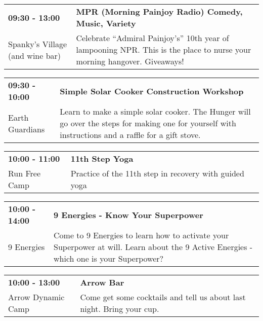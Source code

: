 \begin{tabular}{ p{1in} p{2.2in} }
    \textbf{09:30 - 13:00} & \textbf{MPR (Morning Painjoy Radio) Comedy, Music, Variety} \\
    Spanky's Village (and wine bar) \newline  & Celebrate ``Admiral Painjoy's'' 10th year of lampooning NPR.  This is the place to nurse your morning hangover.  Giveaways! \\
    \hline 
\end{tabular}
    
\begin{tabular}{ p{1in} p{2.2in} }
    \textbf{09:30 - 10:00} & \textbf{Simple Solar Cooker Construction Workshop} \\
    Earth Guardians \newline  & Learn to make a simple solar cooker. The Hunger will go over the steps for making one for yourself with instructions and a raffle for a gift stove. \\
    \hline 
\end{tabular}
    
\begin{tabular}{ p{1in} p{2.2in} }
    \textbf{10:00 - 11:00} & \textbf{11th Step Yoga} \\
    Run Free Camp \newline  & Practice of the 11th step in recovery with guided yoga \\
    \hline 
\end{tabular}
    
\begin{tabular}{ p{1in} p{2.2in} }
    \textbf{10:00 - 14:00} & \textbf{9 Energies - Know Your Superpower} \\
    9 Energies \newline  & Come to 9 Energies to learn how to activate your Superpower at will. Learn about the 9 Active Energies - which one is your Superpower? \\
    \hline 
\end{tabular}
    
\begin{tabular}{ p{1in} p{2.2in} }
    \textbf{10:00 - 13:00} & \textbf{Arrow Bar} \\
    Arrow Dynamic Camp \newline  & Come get some cocktails and tell us about last night. Bring your cup. \\
    \hline 
\end{tabular}
    
